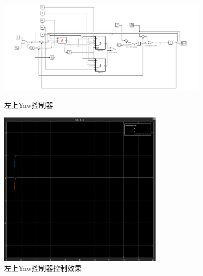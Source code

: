\documentclass[12pt]{article}
\begin{document}
        \begin{figure}[htbp]
            \centering
            \includegraphics[width=0.9\textwidth]{../other/Yaw_1.png}
            \caption{左上Yaw控制器}

            \includegraphics[width=0.7\textwidth]{../other/Yaw_11.png}
            \caption{左上Yaw控制器控制效果}
        \end{figure}
    \newpage
\end{document}
